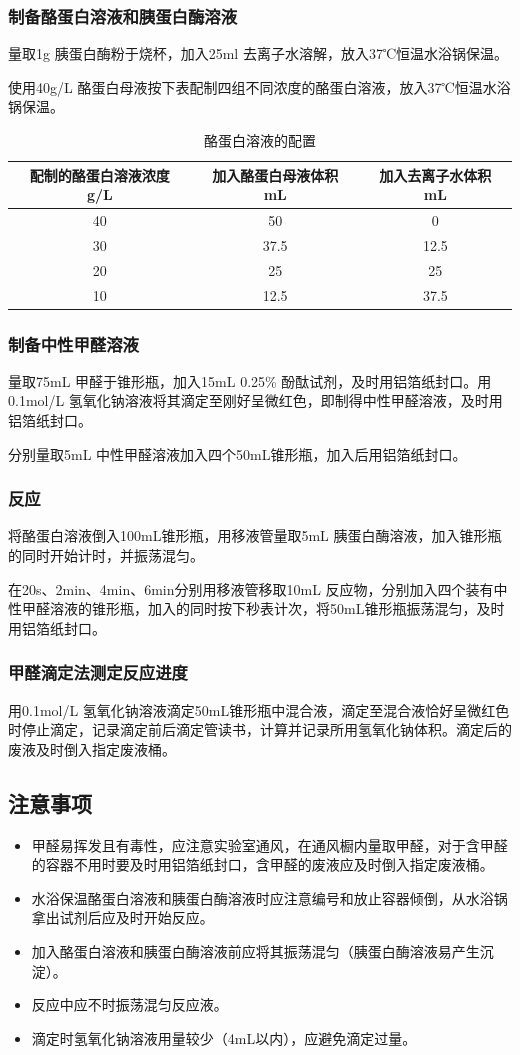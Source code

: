 \documentclass[UTF8]{ctexart}
\begin{document}
	\subsubsection{制备酪蛋白溶液和胰蛋白酶溶液}
	量取1g 胰蛋白酶粉于烧杯，加入25ml 去离子水溶解，放入37℃恒温水浴锅保温。
	
	使用40g/L 酪蛋白母液按下表配制四组不同浓度的酪蛋白溶液，放入37℃恒温水浴锅保温。
	
	\begin{table}[h]
		\centering
		\caption{酪蛋白溶液的配置}
		\begin{tabular}{ccc}
			\toprule
			配制的酪蛋白溶液浓度 g/L & 加入酪蛋白母液体积 mL & 加入去离子水体积 mL \\
			\midrule
			40 & 50 & 0 \\
			30 & 37.5 & 12.5 \\
			20 & 25 & 25 \\
			10 & 12.5 & 37.5 \\
			\bottomrule
		\end{tabular}
	\end{table}
	\subsubsection{制备中性甲醛溶液}
	量取75mL 甲醛于锥形瓶，加入15mL 0.25\% 酚酞试剂，及时用铝箔纸封口。用0.1mol/L 氢氧化钠溶液将其滴定至刚好呈微红色，即制得中性甲醛溶液，及时用铝箔纸封口。
	
	分别量取5mL 中性甲醛溶液加入四个50mL锥形瓶，加入后用铝箔纸封口。
	\subsubsection{反应}
	将酪蛋白溶液倒入100mL锥形瓶，用移液管量取5mL 胰蛋白酶溶液，加入锥形瓶的同时开始计时，并振荡混匀。
	
	在20s、2min、4min、6min分别用移液管移取10mL 反应物，分别加入四个装有中性甲醛溶液的锥形瓶，加入的同时按下秒表计次，将50mL锥形瓶振荡混匀，及时用铝箔纸封口。
	
	\subsubsection{甲醛滴定法测定反应进度}
	用0.1mol/L 氢氧化钠溶液滴定50mL锥形瓶中混合液，滴定至混合液恰好呈微红色时停止滴定，记录滴定前后滴定管读书，计算并记录所用氢氧化钠体积。滴定后的废液及时倒入指定废液桶。
	\subsection{注意事项}
	\begin{itemize}
		\item 甲醛易挥发且有毒性，应注意实验室通风，在通风橱内量取甲醛，对于含甲醛的容器不用时要及时用铝箔纸封口，含甲醛的废液应及时倒入指定废液桶。
		\item 水浴保温酪蛋白溶液和胰蛋白酶溶液时应注意编号和放止容器倾倒，从水浴锅拿出试剂后应及时开始反应。
		\item 加入酪蛋白溶液和胰蛋白酶溶液前应将其振荡混匀（胰蛋白酶溶液易产生沉淀）。
		\item 反应中应不时振荡混匀反应液。
		\item 滴定时氢氧化钠溶液用量较少（4mL以内），应避免滴定过量。
	\end{itemize}
\end{document}
